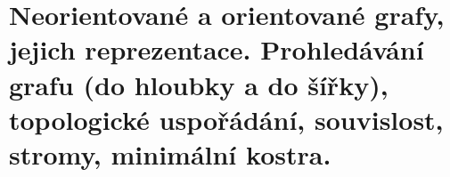 \section[PAL - grafy]{Neorientované a orientované grafy, jejich reprezentace. Prohledávání grafu (do hloubky a do šířky), topologické uspořádání, souvislost, stromy, minimální kostra.}
